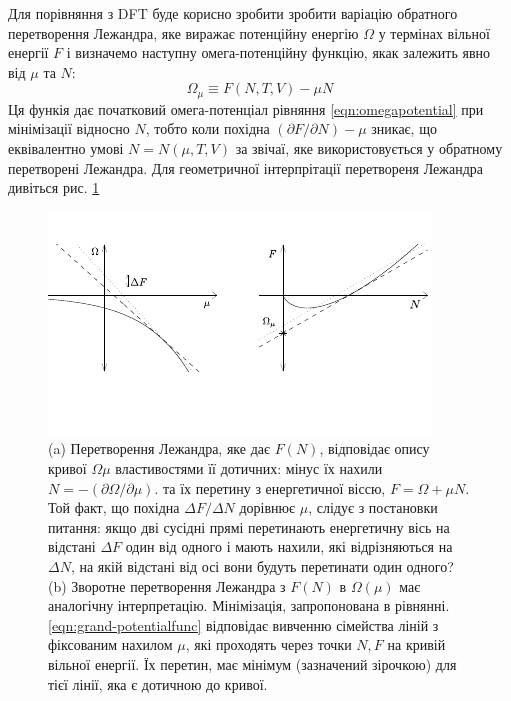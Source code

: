 Для порівняння з DFT буде корисно зробити зробити варіацію обратного перетворення Лежандра, яке виражає потенційну енергію $\Omega$ у термінах вільної енергії $F$ і визначемо наступну омега-потенційну функцію, якак залежить явно від $\mu$ та $N$:
\begin{equation}
	\label{eqn:grand-potentialfunc}
	\Omega_\mu \equiv F(N,T,V) - {\mu} N
\end{equation}
Ця функія дає початковий омега-потенціал рівняння \ref{eqn:omegapotential} при мінімізації відносно $N$, тобто коли похідна $(\partial{F}/\partial{N}) - \mu$ зникає, що еквівалентно умові $N = N(\mu,T,V)$ за звічаї, яке використовується у обратному перетворені Лежандра. Для геометричної інтерпрітації перетвореня Лежандра дивіться рис. \ref{fig:legander_transform}
\begin{figure}[H]
  \centering
  \includegraphics[scale=2.5]{img/Legender_transform.pdf}
  \caption{(a) Перетворення Лежандра, яке дає $F(N)$, відповідає опису кривої $\Omega\mu$ властивостями її дотичних: мінус їх нахили $N = -(\partial{\Omega}/\partial{\mu})$. та їх перетину з енергетичної віссю, $F = \Omega + \mu N$. Той факт, що похідна $\Delta F / \Delta N$ дорівнює $\mu$, слідує з постановки питання: якщо дві сусідні прямі перетинають енергетичну вісь на відстані $\Delta F$ один від одного і мають нахили, які відрізняються на $\Delta N$, на якій відстані від осі вони будуть перетинати один одного? (b) Зворотне перетворення Лежандра з $F(N)$ в $\Omega (\mu)$ має аналогічну інтерпретацію. Мінімізація, запропонована в рівнянні. \ref{eqn:grand-potentialfunc} відповідає вивченню сімейства ліній з фіксованим нахилом $\mu$, які проходять через точки $N, F$ на кривій вільної енергії. Їх перетин, має мінімум (зазначений зірочкою) для тієї лінії, яка є дотичною до кривої.}
  \label{fig:legander_transform}
\end{figure}
